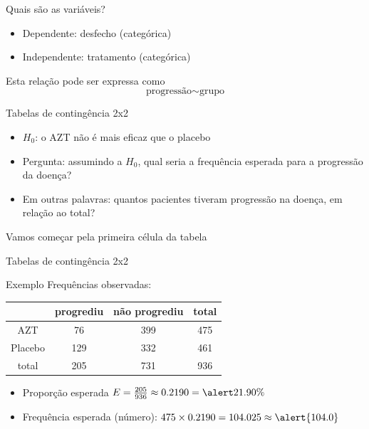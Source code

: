 \documentclass{beamer}
\begin{document}
\begin{frame}{Quais são as variáveis?}
  \begin{itemize}
    \small
  \item Dependente: desfecho (categórica)
  \item Independente: tratamento (categórica)
  \end{itemize}
  \vfill
  \begin{block}{Esta relação pode ser expressa como}
    \begin{displaymath}
      \text{progressão} \sim \text{grupo}
    \end{displaymath}
  \end{block}
\end{frame}

\begin{frame}{Tabelas de contingência 2x2}
  \begin{itemize}
  \item $H_0$: o AZT não é mais eficaz que o placebo
  \item Pergunta: assumindo a $H_0$, qual seria a frequência esperada
    para a progressão da doença?
  \item Em outras palavras: quantos pacientes tiveram progressão na
    doença, em relação ao total?
  \end{itemize}
\end{frame}

\begin{frame}
  \begin{center}
    Vamos começar pela primeira célula da tabela
  \end{center}
\end{frame}

\begin{frame}{Tabelas de contingência 2x2}
  \begin{exampleblock}{Exemplo}
    Frequências observadas:
    \begin{tabular}{c|c|c|c}
      & progrediu & não progrediu & total\\
      \hline
      AZT & 76 & 399 & 475\\
      \hline
      Placebo & 129 & 332 & 461\\
      \hline
      total & \alert{205} & 731 & \alert{936}\\
    \end{tabular}
  \end{exampleblock}
  \vfill
  \begin{itemize}
    \footnotesize
  \item Proporção esperada $E = \frac{205}{936} \approx 0.2190 = \alert{21.90\%}$
  \item Frequência esperada (número): $475 \times 0.2190 = 104.025 \approx \alert{104.0}$
  \end{itemize}
\end{frame}
\end{document}
